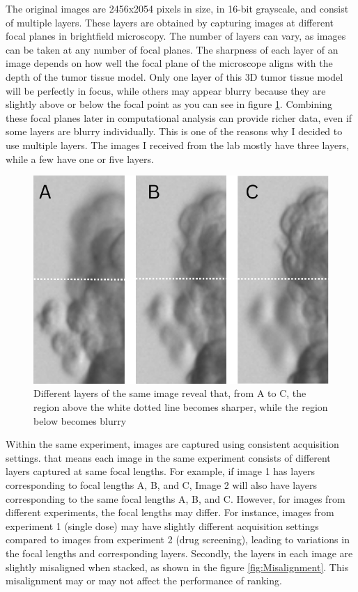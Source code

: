   The original images are 2456x2054 pixels in size, in 16-bit grayscale, and consist of multiple layers. These layers are obtained by capturing images
   at different focal planes in brightfield microscopy. The number of layers can vary, as images can be taken at any number of focal planes. The sharpness 
   of each layer of an image depends on how well the focal plane of the microscope aligns with the depth of the tumor tissue model. Only one layer of this 3D tumor tissue model will 
   be perfectly in focus, while others may appear blurry because they are slightly above or below the focal point as you can see in figure \ref{fig:blur}. Combining these focal planes later in 
   computational analysis can provide richer data, even if some layers are blurry individually. This is one of the reasons why I decided to use multiple
    layers. The images I received from the lab mostly have three layers, while a few have one or five layers.

    \begin{figure}[H]
      \centering
      \includegraphics[scale=0.4]{figures/blur.png} 
      \caption{Different layers of the same image reveal that, from A to C, the region above the white dotted line becomes sharper, while the region below becomes blurry }
      \label{fig:blur}
    \end{figure}

    Within the same experiment, images are 
    captured using consistent acquisition settings. that means each image in the same experiment consists of different layers captured at same focal lengths. For example, if image 1 has layers corresponding to focal
 lengths A, B, and C, Image 2 will also have layers corresponding to the same focal lengths A, B, and C.  However, for images from different experiments, the focal lengths may differ. For instance, images from 
 experiment 1 (single dose) may have slightly different acquisition settings compared to images from experiment 2 (drug screening), leading to variations 
 in the focal lengths and corresponding layers. 
 Secondly, the layers in each image are slightly misaligned when stacked, as shown in the figure  \ref{fig:Misalignment}. This misalignment may or may not affect the performance of ranking.

